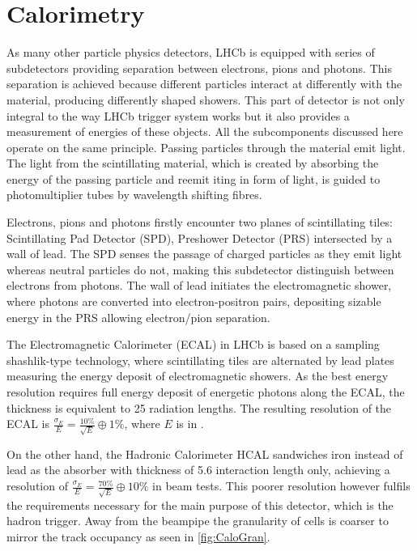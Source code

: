 \section{Calorimetry }
\label{calosys}
As many other particle physics detectors, \Gls{LHCb} is equipped with series of subdetectors providing separation between electrons, pions and photons. This separation is achieved because different particles interact at differently with the material, producing differently shaped showers. This part of detector is not only integral to the way \Gls{LHCb} trigger system works but it also provides a measurement of energies of these objects.
All the subcomponents discussed here operate on the same principle. Passing particles through the material emit light. The light from the scintillating material, which is created by absorbing the energy of the passing particle and reemit iting in form of light, is guided to photomultiplier tubes by wavelength shifting fibres.

Electrons, pions and photons firstly encounter two planes of scintillating tiles: Scintillating Pad Detector (\Gls{SPD}), Preshower Detector (\Gls{PRS}) intersected by a wall of lead. The \Gls{SPD} senses the passage of charged particles as they emit light whereas neutral particles do not, making this subdetector distinguish between electrons from photons. The wall of lead initiates the electromagnetic shower, where photons are converted into electron-positron pairs, depositing sizable energy in the \Gls{PRS} allowing electron/pion separation. 

The Electromagnetic Calorimeter (\Gls{ECAL}) in \gls{LHCb} is based on a sampling shashlik-type technology, where scintillating tiles are alternated by lead plates measuring the energy deposit of electromagnetic showers. As the best energy resolution requires full energy deposit of energetic photons along the \Gls{ECAL}, the thickness is equivalent to 25 radiation lengths. The resulting resolution of the \Gls{ECAL} is $\frac{\sigma_{E}}{E} = \frac{10\%}{\sqrt{E}} \oplus 1\%$, where $E$ is in \gev.

On the other hand, the Hadronic Calorimeter \Gls{HCAL} sandwiches iron instead of lead as the absorber with thickness of 5.6 interaction length only, achieving a resolution of $\frac{\sigma_{E}}{E} = \frac{70\%}{\sqrt{E}} \oplus 10\%$ in beam tests. This poorer resolution however fulfils the requirements necessary for the main purpose of this detector, which is the hadron trigger. Away from the beampipe the granularity of cells is coarser to mirror the track occupancy as seen in \autoref{fig:CaloGran}. 


